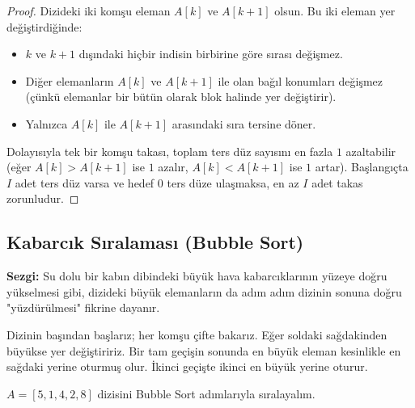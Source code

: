 \begin{proof}
Dizideki iki komşu eleman $A[k]$ ve $A[k+1]$ olsun. Bu iki eleman yer değiştirdiğinde:
\begin{itemize}
    \item $k$ ve $k+1$ dışındaki hiçbir indisin birbirine göre sırası değişmez.
    \item Diğer elemanların $A[k]$ ve $A[k+1]$ ile olan bağıl konumları değişmez (çünkü elemanlar bir bütün olarak blok halinde yer değiştirir).
    \item Yalnızca $A[k]$ ile $A[k+1]$ arasındaki sıra tersine döner.
\end{itemize}
Dolayısıyla tek bir komşu takası, toplam ters düz sayısını en fazla $1$ azaltabilir (eğer $A[k] > A[k+1]$ ise $1$ azalır, $A[k] < A[k+1]$ ise $1$ artar). Başlangıçta $I$ adet ters düz varsa ve hedef $0$ ters düze ulaşmaksa, en az $I$ adet takas zorunludur.
\end{proof}

\subsection{Kabarcık Sıralaması (Bubble Sort)}

\textbf{Sezgi:} Su dolu bir kabın dibindeki büyük hava kabarcıklarının yüzeye doğru yükselmesi gibi, dizideki büyük elemanların da adım adım dizinin sonuna doğru "yüzdürülmesi" fikrine dayanır.

Dizinin başından başlarız; her komşu çifte bakarız. Eğer soldaki sağdakinden büyükse yer değiştiririz. Bir tam geçişin sonunda en büyük eleman kesinlikle en sağdaki yerine oturmuş olur. İkinci geçişte ikinci en büyük yerine oturur.

\begin{example}
$A = [5, 1, 4, 2, 8]$ dizisini Bubble Sort adımlarıyla sıralayalım.
\end{example}

